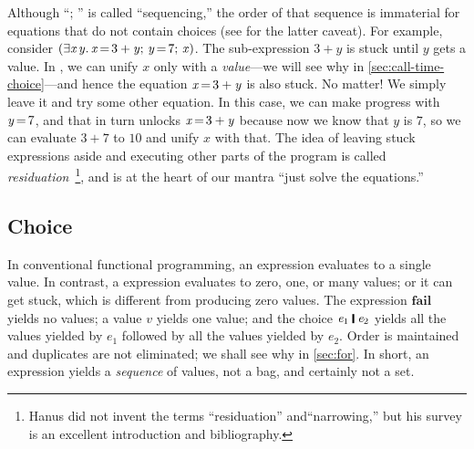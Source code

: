 \documentclass[acmsmall]{acmart}
\newcommand{\Varid}[1]{\mathit{#1}}
\begin{document}
Although ``\ensuremath{;\,}\!'' is called ``sequencing,'' the order of that sequence
is immaterial for equations that do not contain choices (see  for the latter caveat).
For example,
consider \ensuremath{(\exists\Varid{x}\hspace{0.1em}\Varid{y}.\,\Varid{x}\hspace{-0.14em}=\hspace{-0.14em}\mathrm{3}\mathbin{+}\Varid{y};\,\Varid{y}\hspace{-0.14em}=\hspace{-0.14em}\mathrm{7};\,\Varid{x})}.  The sub-expression \ensuremath{\mathrm{3}\mathbin{+}\Varid{y}} is stuck until \ensuremath{\Varid{y}} gets a value.
In \versecalc{}, we can unify \ensuremath{\Varid{x}} only with a \emph{value}---we will see why in \cref{sec:call-time-choice}---and
hence the equation \ensuremath{\Varid{x}\hspace{-0.14em}=\hspace{-0.14em}\mathrm{3}\mathbin{+}\Varid{y}} is also stuck.
No matter!  We simply leave it and try some other equation. In this case, we can make progress with \ensuremath{\Varid{y}\hspace{-0.14em}=\hspace{-0.14em}\mathrm{7}},
and that in turn unlocks \ensuremath{\Varid{x}\hspace{-0.14em}=\hspace{-0.14em}\mathrm{3}\mathbin{+}\Varid{y}} because now we know that \ensuremath{\Varid{y}} is \ensuremath{\mathrm{7}}, so we can evaluate \ensuremath{\mathrm{3}\mathbin{+}\mathrm{7}} to \ensuremath{\mathrm{10}}
and unify \ensuremath{\Varid{x}} with that.  The idea of leaving stuck expressions aside and executing other parts of the
program is called
\emph{residuation}~\cite{hanus:survey}\footnote{Hanus did not invent the terms ``residuation'' and``narrowing,'' but
his survey is an excellent introduction and bibliography.}, and is at the heart of our mantra ``just solve the equations.''

\subsection{Choice} \label{sec:choice} \label{sec:call-time-choice}

In conventional functional programming, an expression evaluates to a single value.
In contrast, a \versecalc{} expression evaluates to zero, one, or many values;
or it can get stuck, which is different from producing zero values.
The expression \ensuremath{\textbf{fail}} yields no values; a value \ensuremath{\Varid{v}} yields one value;
and the choice \ensuremath{\Varid{e}_{\mathrm{1}}\;\rule[-0.1em]{0.15em}{0.75em}\;\Varid{e}_{\mathrm{2}}} yields all the values
yielded by \ensuremath{\Varid{e}_{\mathrm{1}}} followed by all the values yielded by \ensuremath{\Varid{e}_{\mathrm{2}}}.
Order is maintained and duplicates are not eliminated; we shall see why in \cref{sec:for}.
In short, an expression yields a \emph{sequence} of values, not a bag, and certainly not a set.
\end{document}
